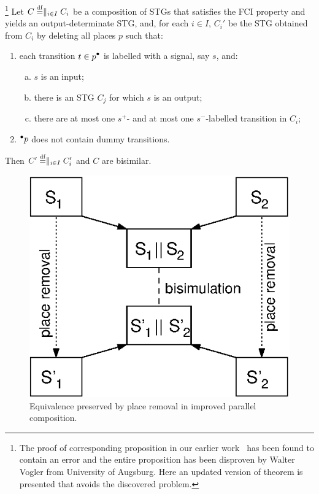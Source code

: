 \begin{proposition}\label{pr-main}\footnote{
The proof of corresponding proposition in our earlier work~\cite{improved_par_comp} has been 
   found to contain an error and the entire proposition has been disproven by Walter Vogler 
   from University of Augsburg. Here an updated version of theorem is presented that avoids the discovered problem.
}
Let $C\stackrel{\mathrm{df}}{=}\parallel_{i\in I}C_{i}$ be a composition of STGs
that satisfies the FCI property and yields an
output-determinate STG, and, for each $i\in I$, $C_{i}'$ be the
STG obtained from $C_{i}$ by deleting all places $p$ such that:
\begin{enumerate}[1.]
\item each transition $t\in\post{p}$ is labelled with a
    signal, say $s$, and:
\begin{enumerate}[a)]
\item\label{only-inputs-in-postset} $s$ is an input;
\item\label{exists-matching-output} there is an STG $C_j$ for which $s$ is an output;
\item\label{injective-labelling} there are at most one
    $s^+$- and at most one $s^-$-la\-bel\-led
    transition in $C_i$;
\end{enumerate}
\item\label{no-dummies-in-preset} ${}^\bullet {p}$ does not
    contain dummy transitions.
\end{enumerate}
Then $C'\stackrel{\mathrm{df}}{=}\parallel_{i\in I}C_i'$ and $C$ are bisimilar.
\end{proposition}

\begin{figure}[!tb]
  \centering
    \includegraphics[scale=1]{fig/parallel_composition}
  \caption[Equivalence preservation by improved parallel composition]{\label{fi-parcomp-improvement-theorem}
    Equivalence preserved by place removal in improved parallel composition.
  }
\end{figure}

